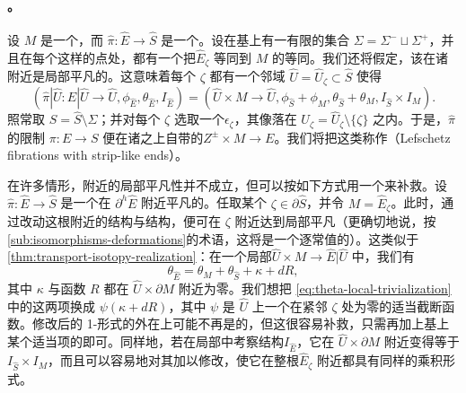 \paragraph{\trFibrationWithStriplikeEnds。}\label{sub:fibrations-striplike-ends}
设 $M$ 是一个\trExactSymplectic\trCorneredBoundary\trManifold，而 $\hat\pi\colon\hat E\to\hat S$ 是一个\trLefschetzFibration。设在基上有一有限的\trPointedBoundary{}集合 $\Sigma=\Sigma^-\sqcup\Sigma^+$，并且在每个这样的点处，都有一个把\trFiber{}$\hat E_\zeta$ 等同到 $M$ 的等同。我们还将假定，该\trFibration{}在诸\trPointedBoundary{}附近是局部平凡的。这意味着每个 $\zeta$ 都有一个邻域 $\hat U=\hat U_\zeta\subset\hat S$ 使得
\begin{equation*}
(\hat\pi|\hat U\colon\hat E|\hat U\to\hat U,\phi_{\hat E},\theta_{\hat E},I_{\hat E})
=(\hat U\times M\to\hat U,\phi_{\hat S}+\phi_M,\theta_{\hat S}+\theta_M,I_{\hat S}\times I_M).
\end{equation*}
照常取 $S=\hat S\setminus\Sigma$；并对每个 $\zeta$ 选取一个\trStriplikeEnd{}$\epsilon_\zeta$，其像落在 $U_\zeta=\hat U_\zeta\setminus\{\zeta\}$ 之内。于是，$\hat\pi$ 的限制 $\pi\colon E\to S$ 便在诸\trStriplikeEnd{}之上自带\trCanonical{}的\trTrivialization{}$Z^\pm\times M\to E$。我们将把这类\trObject{}称作\emph{\trLefschetz\trFibrationWithStriplikeEnds}（Lefschetz fibrations with strip-like ends）。
\begin{remark}\label{thm:local-triviality-deformation}
在许多情形，\trPointedBoundary{}附近的局部平凡性并不\trApriori{}成立，但可以按如下方式用一个\trDeformation{}来补救。设 $\hat\pi\colon\hat E\to\hat S$ 是一个在 $\partial^h\hat E$ 附近平凡的\trLefschetzFibration。任取某个 $\zeta\in\partial\hat S$，并令 $M=\hat E_\zeta$。此时，通过改动这根\trFiber{}附近的\trSymplectic{}结构与\trAlmostComplex{}结构，便可在 $\zeta$ 附近达到局部平凡（更确切地说，按\cref{sub:isomorphisms-deformations}的术语，这将是一个逐\trFiber{}常值的\trDeformation）。这类似于\cref{thm:transport-isotopy-realization}：在一个局部\trTrivialization{}$\hat U\times M\to\hat E|\hat U$ 中，我们有
\begin{equation}\label{eq:theta-local-trivialization}
\theta_{\hat E}=\theta_M+\theta_{\hat S}+\kappa+dR,
\end{equation}
其中 $\kappa$ 与函数 $R$ 都在 $\hat U\times\partial M$ 附近为零。我们想把 \eqref{eq:theta-local-trivialization} 中的这两项换成 $\psi(\kappa+dR)$，其中 $\psi$ 是 $\hat U$ 上一个在紧邻 $\zeta$ 处为零的适当截断函数。修改后的 1-形式的外\trDifferential{}在\trTotalSpace{}上可能不再是\trSymplectic{}的，但这很容易补救，只需再加上基上某个适当项的\trPullback{}即可。同样地，若在局部\trTrivialization{}中考察\trAlmostComplex{}结构{}$I_{\hat E}$，它在 $\hat U\times\partial M$ 附近变得等于 $I_{\hat S}\times I_M$，而且可以容易地对其加以修改，使它在整根\trFiber{}$\hat E_\zeta$ 附近都具有同样的乘积形式。
\end{remark}
